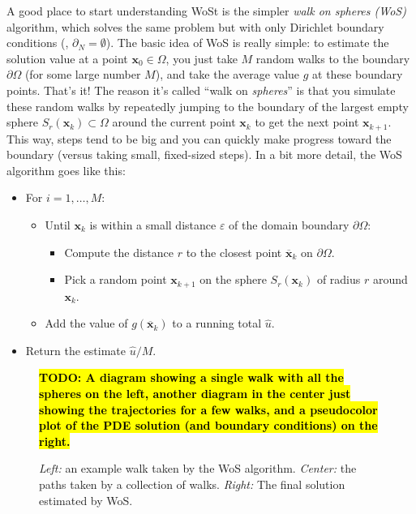 \documentclass{article}
\newcommand{\todo}[1]{\textbf{\hl{TODO: #1}}}
\renewcommand{\vec}[1]{\textbf{#1}}
\begin{document}
A good place to start understanding WoSt is the simpler \emph{walk on spheres (WoS)} algorithm, which solves the same problem but with only Dirichlet boundary conditions (\ie, \(\partial_N = \emptyset\)).  The basic idea of WoS is really simple: to estimate the solution value at a point \(\vec{x}_0 \in \Omega\), you just take \(M\) random walks to the boundary \(\partial\Omega\) (for some large number \(M\)), and take the average value \(g\) at these boundary points.  That's it!  The reason it's called ``walk on \emph{spheres}'' is that you simulate these random walks by repeatedly jumping to the boundary of the largest empty sphere \(S_r(\vec{x}_k) \subset \Omega\) around the current point \(\vec{x}_k\) to get the next point \(\vec{x}_{k+1}\).  This way, steps tend to be big and you can quickly make progress toward the boundary (versus taking small, fixed-sized steps).  In a bit more detail, the WoS algorithm goes like this:

\begin{itemize}
   \item For \(i = 1, \ldots, M\):
\begin{itemize}
   \item Until \(\vec{x}_k\) is within a small distance \(\varepsilon\) of the domain boundary \(\partial\Omega\):
      \begin{itemize}
         \item Compute the distance \(r\) to the closest point \(\overline{\vec{x}}_k\) on \(\partial\Omega\).
         \item Pick a random point \(\vec{x}_{k+1}\) on the sphere \(S_r(\vec{x}_k)\) of radius \(r\) around \(\vec{x}_k\).
      \end{itemize}
   \item Add the value of \(g(\overline{\vec{x}}_k)\) to a running total \(\widehat{u}\).
\end{itemize}
   \item Return the estimate \(\widehat{u}/M\).
\end{itemize}

\begin{figure}[h!]
   \todo{A diagram showing a single walk with all the spheres on the left, another diagram in the center just showing the trajectories for a few walks, and a pseudocolor plot of the PDE solution (and boundary conditions) on the right.}
   \caption{\emph{Left:} an example walk taken by the WoS algorithm. \emph{Center:} the paths taken by a collection of walks. \emph{Right:} The final solution estimated by WoS.\label{fig:WoSExample}}
\end{figure}
\end{document}
